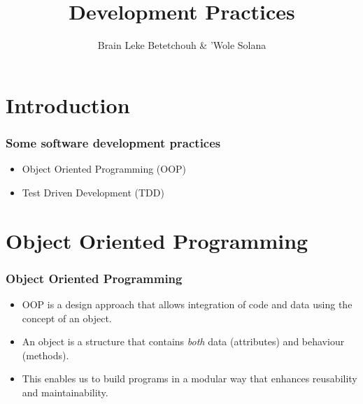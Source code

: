 \documentclass[10pt,t,xcolor=dvipsnames]{beamer}
\title{ Development Practices }
\author{ Brain Leke Betetchouh \& 'Wole Solana }
\begin{document}
\nocite*{}
\frame [c, plain]{\titlepage}
\section{Introduction}
\begin{frame}
\frametitle{Some software development practices}
\pause
\begin{itemize}[<+->]
\item Object Oriented Programming (OOP)
\item Test Driven Development (TDD)
\end{itemize}
\end{frame}
\section{Object Oriented Programming}
\begin{frame}[fragile]
\frametitle{Object Oriented Programming}
\pause
\begin{itemize}[<+->]
\item OOP is a design approach that allows integration of code and data using the concept of an \alert{object}.
\item An \alert{object} is a structure that contains \textit{both} data (attributes) and behaviour (methods).
\item This enables us to build programs in a modular way that enhances reusability and maintainability.
\end{itemize}
\end{frame}
\end{document}
